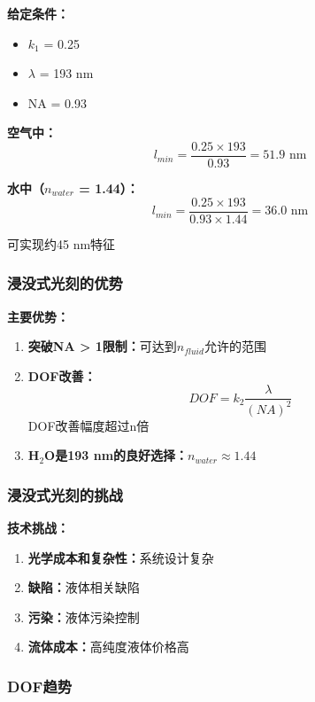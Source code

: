 \documentclass[UTF8,12pt,a4paper]{ctexart}
\begin{document}
\textbf{给定条件：}
\begin{itemize}
    \item $k_1$ = 0.25
    \item $\lambda$ = 193 nm
    \item NA = 0.93
\end{itemize}

\textbf{空气中：}
\begin{equation}
l_{min} = \frac{0.25 \times 193}{0.93} = 51.9 \text{ nm}
\end{equation}

\textbf{水中（$n_{water}$ = 1.44）：}
\begin{equation}
l_{min} = \frac{0.25 \times 193}{0.93 \times 1.44} = 36.0 \text{ nm}
\end{equation}

可实现约45 nm特征

\subsubsection{浸没式光刻的优势}

\textbf{主要优势：}
\begin{enumerate}
    \item \textbf{突破NA > 1限制：}可达到$n_{fluid}$允许的范围
    \item \textbf{DOF改善：}
    \begin{equation}
    DOF = k_2\frac{\lambda}{(NA)^2}
    \end{equation}
    DOF改善幅度超过n倍
    \item \textbf{H$_2$O是193 nm的良好选择：}$n_{water} \approx 1.44$
\end{enumerate}

\subsubsection{浸没式光刻的挑战}

\textbf{技术挑战：}
\begin{enumerate}
    \item \textbf{光学成本和复杂性：}系统设计复杂
    \item \textbf{缺陷：}液体相关缺陷
    \item \textbf{污染：}液体污染控制
    \item \textbf{流体成本：}高纯度液体价格高
\end{enumerate}

\subsubsection{DOF趋势}
\end{document}
